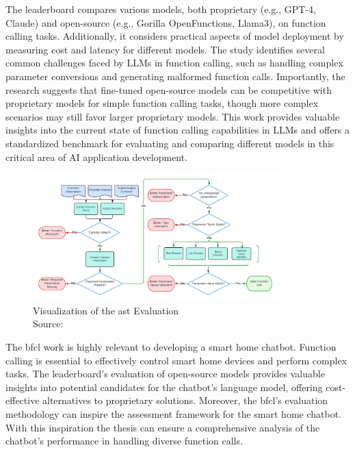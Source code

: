 The leaderboard compares various models, both proprietary (e.g., GPT-4, Claude) and open-source (e.g., Gorilla OpenFunctions, Llama3), on function calling tasks. 
Additionally, it considers practical aspects of model deployment by measuring cost and latency for different models. 
The study identifies several common challenges faced by LLMs in function calling, such as handling complex parameter conversions and generating malformed function calls. 
Importantly, the research suggests that fine-tuned open-source models can be competitive with proprietary models for simple function calling tasks, though more complex scenarios may still favor larger proprietary models. 
This work provides valuable insights into the current state of function calling capabilities in LLMs and offers a standardized benchmark for evaluating and comparing different models in this critical area of AI application development.

\begin{figure}[h]
  \centering
  \captionsetup{justification=centering}
  \includegraphics[width=0.85\textwidth]{graphics/bfcl-ast.jpeg}
  \caption{Visualization of the \gls{ast} Evaluation\\Source: \citet{berkeley-function-calling-leaderboard}}
  \label{fig:ast}
\end{figure}

The \gls{bfcl} work is highly relevant to developing a smart home chatbot. 
Function calling is essential to effectively control smart home devices and perform complex tasks. 
The leaderboard's evaluation of open-source models provides valuable insights into potential candidates for the chatbot's language model, offering cost-effective alternatives to proprietary solutions. 
Moreover, the \gls{bfcl}'s evaluation methodology can inspire the assessment framework for the smart home chatbot. 
With this inspiration the thesis can ensure a comprehensive analysis of the chatbot's performance in handling diverse function calls.

